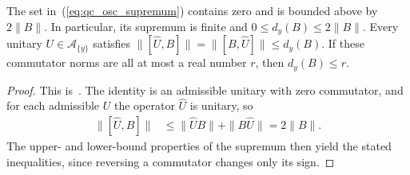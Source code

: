 \begin{lemma}
    \label{thm:qc_site_oscillation_bounds}
    \leanok
    The set in~(\ref{eq:qc_osc_supremum}) contains zero and is bounded
    above by $2\|B\|$. In particular, its supremum is finite and
    $0\le d_y(B)\le2\|B\|$. Every unitary $U\in\mathcal A_{\{y\}}$
    satisfies $\|[\widehat U,B]\|=\|[B,\widehat U]\|\le d_y(B)$.
    If these commutator norms are all at most a real number $r$, then
    $d_y(B)\le r$.
\end{lemma}
\begin{proof}
    \leanok
    This is~\cite[``Bounds for the oscillation
        supremum'']{QICLean2026Blueprint}.
    The identity is an admissible unitary with zero commutator, and for each
    admissible $U$ the operator $\widehat U$ is unitary, so
    \begin{align}
        \|[\widehat U,B]\|
         & \le\|\widehat UB\|+\|B\widehat U\|=2\|B\|.
        \label{eq:qc_osc_commutator_bound}
    \end{align}
    The upper- and lower-bound properties of the supremum then yield the
    stated inequalities, since reversing a commutator changes only its sign.
\end{proof}

